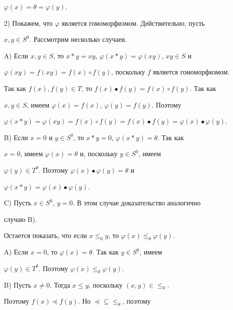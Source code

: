 $\varphi(x)=\theta=\varphi(y)$. 


 


2) Покажем, что $\varphi$ является гомоморфизмом. Действительно, пусть 


$x,y \in S^0$. Рассмотрим несколько случаев. 


 


A) Если $x,y\in S$, то $x*y=xy$, $\varphi(x*y)=\varphi(xy)$, $xy\in S$ и 


$\varphi(xy)=f(xy)=f(x)\circ f(y)$, поскольку $f$ является гомоморфизмом. 


Так как $f(x),f(y)\in T$, то $f(x)\bullet f(y)=f(x)\circ f(y)$. Так как 


$x,y\in S$, имеем $\varphi(x)=f(x)$, $\varphi(y)=f(y)$. Поэтому 


$\varphi(x*y)=\varphi(xy)=f(x)\circ f(y)=f(x)\bullet 


f(y)=\varphi(x)\bullet \varphi(y)$. 


 


B) Если $x=0$ и $y\in S^0$, то $x*y=0$, $\varphi(x*y)=\theta$. Так как 


$x=0$, имеем $\varphi(x)=\theta$ и, поскольку $y\in S^0$, имеем 


$\varphi(y)\in T^\theta$. Поэтому $\varphi(x)\bullet \varphi(y)=\theta$ и 


$\varphi(x*y)=\varphi(x)\bullet \varphi(y)$. 


 


C) Пусть $x\in S^0$, $y=0$. В этом случае доказательство аналогично 


случаю B). 


 


Остается показать, что если $x\le_0 y$, то $\varphi(x)\le_\theta 


\varphi(y)$. 


 


A) Если $x=0$, то $\varphi(x)=\theta$. Так как $y\in S^0$, имеем 


$\varphi(y)\in T^\theta$. Поэтому $\varphi(x)\le_\theta \varphi(y)$. 


 


B) Пусть $x\ne0$. Тогда $x\le y$, поскольку $(x,y)\in\le_0$. 


Поэтому $f(x)\preceq f(y)$. Но $\preceq\subseteq\le_\theta$, поэтому 


